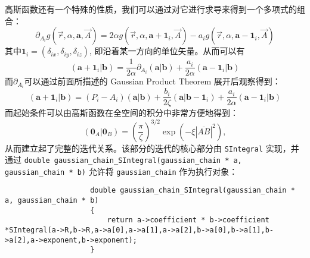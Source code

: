 \documentclass[12pt,a4paper,openany,twoside]{article}
\numberwithin{equation}{section}
\begin{document}
                高斯函数还有一个特殊的性质，我们可以通过对它进行求导来得到一个多项式的组合：
                \begin{equation}
                    \partial_{A_i} g(\vec{r},\alpha,\boldsymbol{a},\vec{A}) = 2 \alpha g(\vec{r},\alpha,\boldsymbol{a} + \boldsymbol{1}_i,\vec{A}) - a_i g(\vec{r},\alpha,\boldsymbol{a} - \boldsymbol{1}_i,\vec{A})
                \end{equation}
                其中$\boldsymbol{1}_i = (\delta_{ix},\delta_{iy},\delta_{iz})$, 即沿着某一方向的单位矢量。从而可以有
                \begin{equation}
                    (\boldsymbol{a}+\boldsymbol{1}_i|\boldsymbol{b}) = \frac{1}{2\alpha} \partial_{A_i} (\boldsymbol{a}|\boldsymbol{b}) + \frac{a_i}{2\alpha} (\boldsymbol{a}-\boldsymbol{1}_i|\boldsymbol{b})
                \end{equation}
                而$\partial_{A_i}$可以通过前面所描述的 Gaussian Product Theorem 展开后观察得到：
                \begin{equation}
                    (\boldsymbol{a}+\boldsymbol{1}_i|\boldsymbol{b}) = (P_i - A_i)(\boldsymbol{a}|\boldsymbol{b}) +  \frac{b_i}{2\zeta} (\boldsymbol{a}|\boldsymbol{b}-\boldsymbol{1}_i) + \frac{a_i}{2\alpha} (\boldsymbol{a}-\boldsymbol{1}_i|\boldsymbol{b})
                \end{equation}
                而起始条件可以由高斯函数在全空间的积分中非常方便地得到：
                \begin{equation}
                    (\boldsymbol{0}_A|\boldsymbol{0}_B) = \left(\frac{\pi}{\zeta}\right)^{3/2} \exp(- \xi |\overline{AB}|^2),
                \end{equation}
                从而建立起了完整的迭代关系。该部分的迭代的核心部分由 \lstinline$SIntegral$ 实现，并通过 \lstinline$double gaussian_chain_SIntegral(gaussian_chain * a, gaussian_chain * b)$ 允许将 \lstinline$gaussian_chain$ 作为执行对象：
                \begin{lstlisting}
                    double gaussian_chain_SIntegral(gaussian_chain * a, gaussian_chain * b)
                    {
                        return a->coefficient * b->coefficient *SIntegral(a->R,b->R,a->a[0],a->a[1],a->a[2],b->a[0],b->a[1],b->a[2],a->exponent,b->exponent);
                    }
                \end{lstlisting}
                
\end{document}
